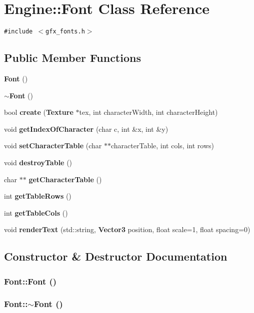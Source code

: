 \section{Engine::Font Class Reference}
\label{classEngine_1_1Font}
{\tt \#include $<$gfx\_\-fonts.h$>$}

\subsection*{Public Member Functions}
\begin{CompactItemize}
\item 
{\bf Font} ()
\item 
{\bf $\sim$Font} ()
\item 
bool {\bf create} ({\bf Texture} $\ast$tex, int characterWidth, int characterHeight)
\item 
void {\bf getIndexOfCharacter} (char c, int \&x, int \&y)
\item 
void {\bf setCharacterTable} (char $\ast$$\ast$characterTable, int cols, int rows)
\item 
void {\bf destroyTable} ()
\item 
char $\ast$$\ast$ {\bf getCharacterTable} ()
\item 
int {\bf getTableRows} ()
\item 
int {\bf getTableCols} ()
\item 
void {\bf renderText} (std::string, {\bf Vector3} position, float scale=1, float spacing=0)
\end{CompactItemize}


\subsection{Constructor \& Destructor Documentation}
\subsubsection{\setlength{\rightskip}{0pt plus 5cm}Font::Font ()}\label{classEngine_1_1Font_4e6a119206f505522100221c1fafde45}


\subsubsection{\setlength{\rightskip}{0pt plus 5cm}Font::$\sim$Font ()}\label{classEngine_1_1Font_134aaa2f78af0c12d3ce504957169768}




